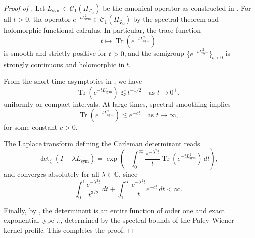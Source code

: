\begin{proof}[Proof of ]
Let \( L_{\mathrm{sym}} \in \mathcal{C}_1(H_{\Psi_\alpha}) \) be the canonical operator as constructed in . For all \( t > 0 \), the operator \( e^{-t L_{\mathrm{sym}}^2} \in \mathcal{C}_1(H_{\Psi_\alpha}) \) by the spectral theorem and holomorphic functional calculus. In particular, the trace function
\[
t \mapsto \operatorname{Tr}(e^{-t L_{\mathrm{sym}}^2})
\]
is smooth and strictly positive for \( t > 0 \), and the semigroup \( \{ e^{-t L_{\mathrm{sym}}^2} \}_{t > 0} \) is strongly continuous and holomorphic in \( t \).

\smallskip
\noindent
From the short-time asymptotics in , we have
\[
\operatorname{Tr}(e^{-t L_{\mathrm{sym}}^2}) \lesssim t^{-1/2} \quad \text{as } t \to 0^+,
\]
uniformly on compact intervals. At large times, spectral smoothing implies
\[
\operatorname{Tr}(e^{-t L_{\mathrm{sym}}^2}) \lesssim e^{-c t} \quad \text{as } t \to \infty,
\]
for some constant \( c > 0 \).

\smallskip
\noindent
The Laplace transform defining the Carleman determinant reads
\[
\det\nolimits_\zeta(I - \lambda L_{\mathrm{sym}})
= \exp\left( - \int_0^\infty \frac{e^{-\lambda^2 t}}{t} \operatorname{Tr}(e^{-t L_{\mathrm{sym}}^2}) \, dt \right),
\]
and converges absolutely for all \( \lambda \in \mathbb{C} \), since
\[
\int_0^1 \frac{e^{-\lambda^2 t}}{t^{3/2}}\, dt + \int_1^\infty \frac{e^{-\lambda^2 t}}{t} e^{-c t} \, dt < \infty.
\]

\smallskip
\noindent
Finally, by , the determinant is an entire function of order one and exact exponential type \( \pi \), determined by the spectral bounds of the Paley--Wiener kernel profile. This completes the proof.
\end{proof}
